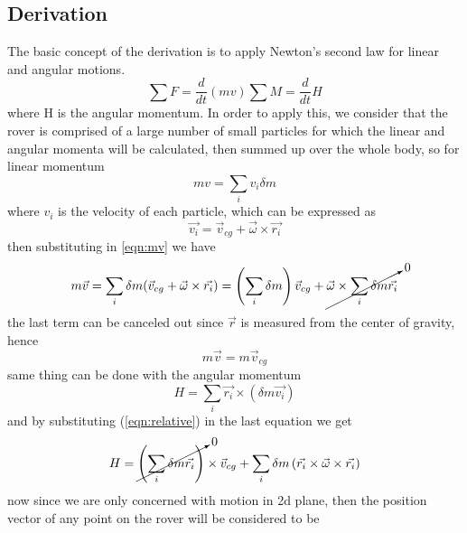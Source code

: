 \documentclass{article}
\begin{document}
	\subsection{Derivation}
	The basic concept of the derivation is to apply Newton's second law for linear and angular motions.
	\begin{subequations}
	\begin{equation}
	\sum F = \frac{d}{dt}\left(mv\right)
	\end{equation} 
	\begin{equation}
	\sum M = \frac{d}{dt} H
	\end{equation}
	\label{eqn:newton_second}
	\end{subequations}
	where H is the angular momentum. In order to apply this, we consider that the rover is comprised of a large number of small particles for which the linear and angular momenta will be calculated, then summed up over the whole body, so for linear momentum
	\begin{equation}
	mv = \sum_{i} v_i\delta m 
	\label{eqn:mv}
	\end{equation}
	where $v_i$ is the velocity of each particle, which can be expressed as
	\begin{equation}
	\vec{v_i} = \vec{v}_{cg} + \vec{\omega} \times \vec{r_i} 
	\label{eqn:relative}
	\end{equation}
	then substituting in \ref{eqn:mv} we have
	\begin{equation}
	m\vec{v} = \sum_{i}\delta m(\vec{v}_{cg} + \vec{\omega}\times\vec{r_i}) = \left(\sum_{i}\delta m\right)\vec{v}_{cg} + \cancelto{0}{\vec{\omega}\times \sum_{i} \delta m \vec{r_i}}
	\end{equation}
	the last term can be canceled out since $\vec{r}$ is measured from the center of gravity, hence
	\begin{equation}
	m\vec{v} = m\vec{v}_{cg}
	\end{equation}
	same thing can be done with the angular momentum
	\begin{equation}
	H = \sum_{i}\vec{r_i}\times \left(\delta m\vec{v_i}\right)
	\end{equation}
	and by substituting (\ref{eqn:relative}) in the last equation we get
	\begin{equation}
	H = \cancelto{0}{\left(\sum_{i}\delta m\vec{r_i}\right)}\times\vec{v}_{cg} + \sum_{i}\delta m\left(\vec{r_i}\times \vec{\omega}\times\vec{r_i}\right)
 	\label{eqn:H}
	\end{equation}
	now since we are only concerned with motion in 2d plane, then the position vector of any point on the rover will be considered to be 
\end{document}

